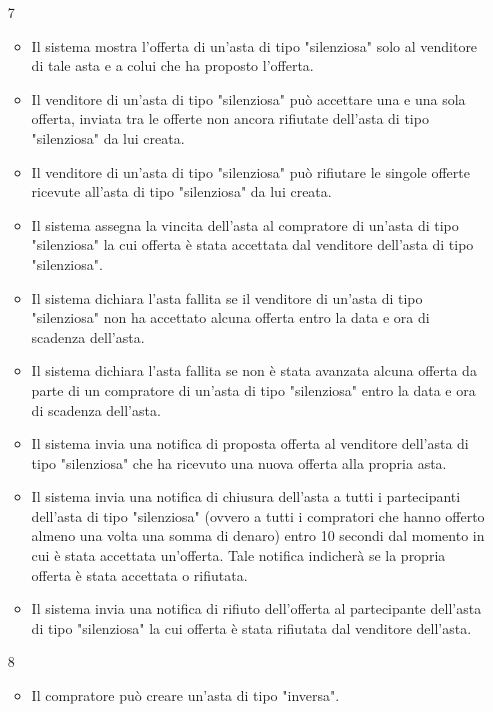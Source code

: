\begin{itemize}
            \item[7] 
                \begin{itemize}
                    \item Il sistema mostra l'offerta di un'asta di tipo "silenziosa" solo al venditore di tale asta e a colui che ha proposto l'offerta.
                    \item Il venditore di un'asta di tipo "silenziosa" può accettare una e una sola offerta, inviata tra le offerte non ancora rifiutate dell'asta di tipo "silenziosa" da lui creata.
                    \item Il venditore di un'asta di tipo "silenziosa" può rifiutare le singole offerte ricevute all'asta di tipo "silenziosa" da lui creata.
                    \item Il sistema assegna la vincita dell'asta al compratore di un'asta di tipo "silenziosa" la cui offerta è stata accettata dal venditore dell'asta di tipo "silenziosa".
                    \item Il sistema dichiara l'asta fallita se il venditore di un'asta di tipo "silenziosa" non ha accettato alcuna offerta entro la data e ora di scadenza dell'asta.
                    \item Il sistema dichiara l'asta fallita se non è stata avanzata alcuna offerta da parte di un compratore di un'asta di tipo "silenziosa" entro la data e ora di scadenza dell'asta.
                    \item Il sistema invia una notifica di proposta offerta al venditore dell'asta di tipo "silenziosa" che ha ricevuto una nuova offerta alla propria asta.
                    \item Il sistema invia una notifica di chiusura dell'asta a tutti i partecipanti dell'asta di tipo "silenziosa" (ovvero a tutti i compratori che hanno offerto almeno una volta una somma di denaro) entro 10 secondi dal momento in cui è stata accettata un'offerta. Tale notifica indicherà se la propria offerta è stata accettata o rifiutata.
                    \item Il sistema invia una notifica di rifiuto dell'offerta al partecipante dell'asta di tipo "silenziosa" la cui offerta è stata rifiutata dal venditore dell'asta.
                \end{itemize}
            \item[8]
                \begin{itemize}            
                    \item Il compratore può creare un'asta di tipo "inversa".

\end{itemize}
\end{itemize}
